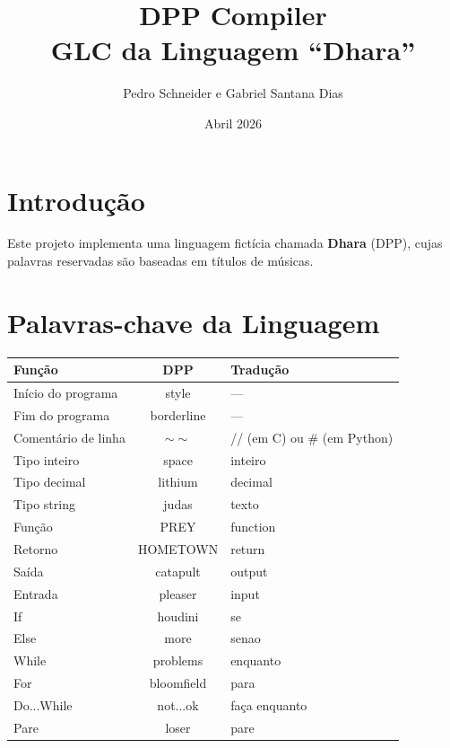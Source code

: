 \documentclass[a4paper,12pt]{article}
\title{DPP Compiler \\ GLC da Linguagem ``Dhara''}
\author{Pedro Schneider e Gabriel Santana Dias}
\date{Abril 2026}
\begin{document}
\maketitle
\section{Introdução}
Este projeto implementa uma linguagem fictícia chamada \textbf{Dhara} (DPP), cujas palavras reservadas são baseadas em títulos de músicas.
\section{Palavras-chave da Linguagem}
\begin{longtable}{|l|c|l|}
\hline
\textbf{Função} & \textbf{DPP} & \textbf{Tradução} \\
\hline
Início do programa & style & --- \\
Fim do programa & borderline & --- \\
Comentário de linha & $\sim\sim$ & // (em C) ou \# (em Python) \\
Tipo inteiro & space & inteiro \\
Tipo decimal & lithium & decimal \\
Tipo string & judas & texto \\
Função & PREY & function \\
Retorno & HOMETOWN & return \\
Saída & catapult & output \\
Entrada & pleaser & input \\
If & houdini & se \\
Else & more & senao \\
While & problems & enquanto \\
For & bloomfield & para \\
Do...While & not...ok & faça enquanto \\
Pare & loser & pare \\
\hline
\end{longtable}

\newpage
\end{document}
